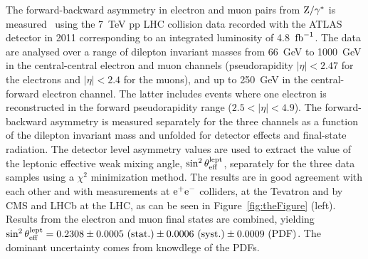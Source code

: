 \documentclass{blois}
\begin{document}
The forward-backward asymmetry in electron and muon pairs from ${\rm Z}/\gamma^*$
is measured~\cite{bib:ATLAS-fb-asymmetry} using the 7~TeV pp LHC collision data
recorded with the ATLAS~\cite{bib:ATLAS-detector} detector in 2011 corresponding to an integrated luminosity
of 4.8~${\rm fb}^{-1}$. The data are analysed over a range of dilepton invariant
masses from 66~GeV to 1000~GeV in the central-central electron and muon channels
(pseudorapidity $|\eta| < 2.47$ for the electrons and $|\eta| < 2.4$ for the muons),
and up to 250~GeV in the central-forward electron channel. The latter includes
events where one electron is reconstructed in the forward pseudorapidity range
($2.5 < |\eta| < 4.9$). The forward-backward asymmetry is measured separately
for the three channels as a function of the dilepton invariant mass and unfolded
for detector effects and final-state radiation. The detector level asymmetry
values are used to extract the value of the leptonic effective weak mixing angle,
$\sin^2\theta_{\rm eff}^{\rm lept}$, separately for the three data samples using
a $\chi^2$ minimization method. The results are in good agreement with each other
and with measurements at ${\rm e}^+{\rm e}^-$ colliders, at the Tevatron and by
CMS and LHCb at the LHC, as can be seen in Figure~\ref{fig:theFigure} (left). Results
from the electron and muon final states are combined, yielding
$\sin^2\theta_{\rm eff}^{\rm lept} = 0.2308 \pm 0.0005~({\rm stat.}) \pm 0.0006~({\rm syst.}) \pm 0.0009~({\rm PDF})$.
The dominant uncertainty comes from knowdlege of the PDFs.
%
\end{document}

